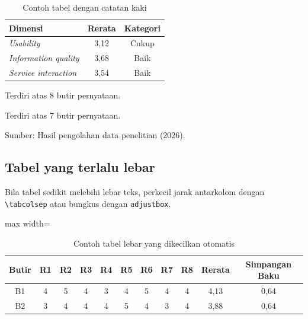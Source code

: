 \begin{table}[H]
    \centering
    \begin{threeparttable}
        \caption{Contoh tabel dengan catatan kaki}
        \label{tab:g-catatan}
        \begin{tabular}{|l|c|c|}
            \hline
            \textbf{Dimensi} & \textbf{Rerata} & \textbf{Kategori} \\ \hline
            \textit{Usability}\tnote{a}           & 3,12 & Cukup \\ \hline
            \textit{Information quality}          & 3,68 & Baik  \\ \hline
            \textit{Service interaction}\tnote{b} & 3,54 & Baik  \\ \hline
        \end{tabular}
        \begin{tablenotes}\footnotesize
            \item[a] Terdiri atas 8 butir pernyataan.
            \item[b] Terdiri atas 7 butir pernyataan.
            \item Sumber: Hasil pengolahan data penelitian (2026).
        \end{tablenotes}
    \end{threeparttable}
\end{table}

\subsection{Tabel yang terlalu lebar}
Bila tabel sedikit melebihi lebar teks, perkecil jarak antarkolom dengan
\texttt{\textbackslash tabcolsep} atau bungkus dengan \texttt{adjustbox}.

\begin{table}[H]
    \centering
    \caption{Contoh tabel lebar yang dikecilkan otomatis}
    \label{tab:g-lebar}
    \footnotesize
    \begin{adjustbox}{max width=\textwidth}
    \begin{tabular}{|c|c|c|c|c|c|c|c|c|c|c|}
        \hline
        \textbf{Butir} & \textbf{R1} & \textbf{R2} & \textbf{R3} & \textbf{R4} & \textbf{R5} & \textbf{R6} & \textbf{R7} & \textbf{R8} & \textbf{Rerata} & \textbf{Simpangan Baku} \\ \hline
        B1 & 4 & 5 & 4 & 3 & 4 & 5 & 4 & 4 & 4,13 & 0,64 \\ \hline
        B2 & 3 & 4 & 4 & 4 & 5 & 4 & 3 & 4 & 3,88 & 0,64 \\ \hline
    \end{tabular}
    \end{adjustbox}
\end{table}


